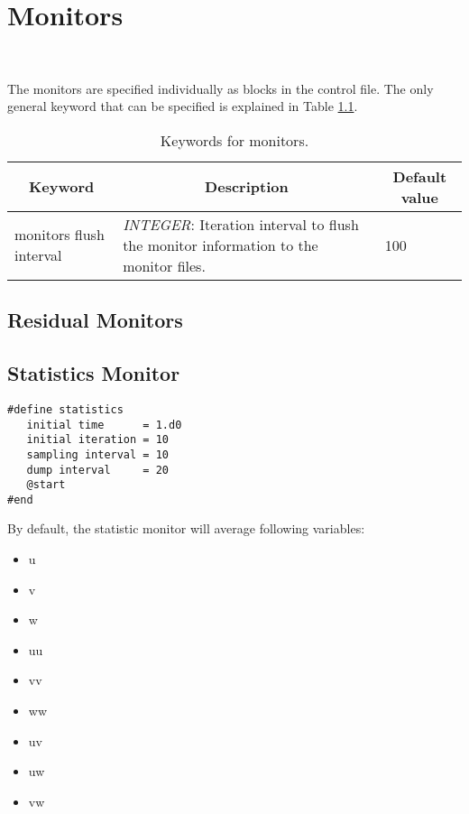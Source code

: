 \documentclass[a4paper,10pt]{report}
\begin{document}
\chapter{Monitors}~\label{sect:monitors}

The monitors are specified individually as blocks in the control file.
The only general keyword that can be specified is explained in Table \ref{tab:monitorsKey}.



\begin{table}[h]
\caption{Keywords for monitors.} \label{tab:monitorsKey}

\begin{tabular}{|p{4cm}|p{10cm}|p{2.2cm}|}
\hline
\multicolumn{1}{|c|}{\textbf{Keyword}} & \multicolumn{1}{c|}{\textbf{Description}} & \multicolumn{1}{c|}{\textbf{Default value}} \\ \hline

monitors flush interval 	&
			\textit{INTEGER}: Iteration interval to flush the monitor information to the monitor files. &
							100 \\ \hline

\end{tabular}
\end{table}

\section{Residual Monitors}

\section{Statistics Monitor}
\begin{lstlisting}
#define statistics
   initial time      = 1.d0
   initial iteration = 10
   sampling interval = 10
   dump interval     = 20
   @start
#end
\end{lstlisting}

By default, the statistic monitor will average following variables:

\begin{multicols}{3}
\begin{itemize}
\item u
\item v
\item w
\item uu
\item vv
\item ww
\item uv
\item uw
\item vw
\end{itemize}
\end{multicols}
\end{document}

